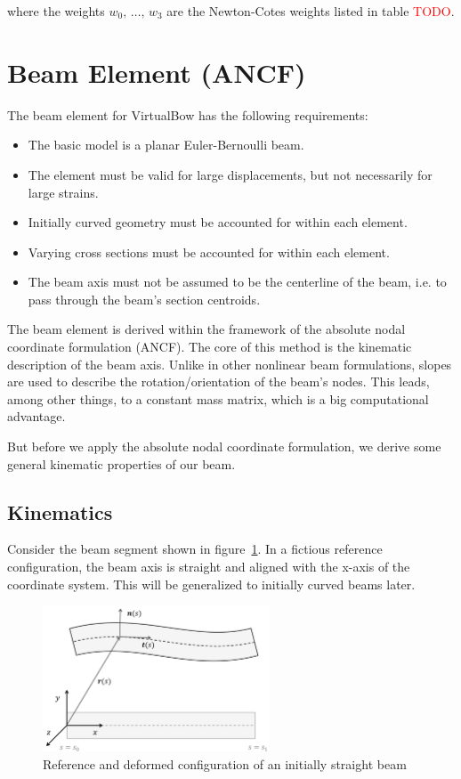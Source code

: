 where the weights $w_0,\,\ldots,\,w_3$ are the Newton-Cotes weights listed in table \textcolor{red}{TODO}.

\newpage
\section{Beam Element (ANCF)}

The beam element for VirtualBow has the following requirements:

\begin{itemize}
\item The basic model is a planar Euler-Bernoulli beam.
\item The element must be valid for large displacements, but not necessarily for large strains.
\item Initially curved geometry must be accounted for within each element.
\item Varying cross sections must be accounted for within each element.
\item The beam axis must not be assumed to be the centerline of the beam, i.e. to pass through the beam's section centroids.
\end{itemize}

The beam element is derived within the framework of the absolute nodal coordinate formulation (ANCF).
The core of this method is the kinematic description of the beam axis.
Unlike in other nonlinear beam formulations, slopes are used to describe the rotation/orientation of the beam's nodes.
This leads, among other things, to a constant mass matrix, which is a big computational advantage.

But before we apply the absolute nodal coordinate formulation, we derive some general kinematic properties of our beam.

\subsection{Kinematics}

Consider the beam segment shown in figure~\ref{fig:beam-kinematics-referenceline}.
In a fictious reference configuration, the beam axis is straight and aligned with the x-axis of the coordinate system.
This will be generalized to initially curved beams later.

\begin{figure}[h]
\centering
\includegraphics[width=0.6\textwidth]{figures/elements/beam-kinematics-referenceline}
\caption{Reference and deformed configuration of an initially straight beam}
\label{fig:beam-kinematics-referenceline}
\end{figure}


